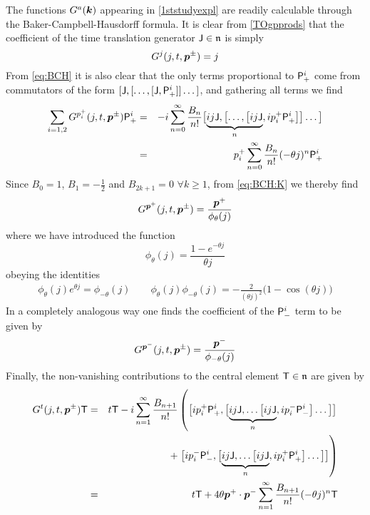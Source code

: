 The functions $G^a(\mk)$ appearing in \eqref{1ststudyexpl} are readily
calculable through the Baker-Campbell-Hausdorff formula. It is clear from
\eqref{TOgpprods} that the coefficient of the time translation generator
$\J\in\mfn$ is simply
\begin{equation}
  \label{Gj}
  G^j(j,t,\mbp^\pm)=j
\end{equation}
From \eqref{eq:BCH} it is also clear that the only terms proportional to
$\P^i_+$ come from commutators of the form $[\J,[\dots,[\J,\P^i_+] ]\dots]$, and
gathering all terms we find
\begin{eqnarray}
  \label{GomzBn}
  \sum\limits_{i=1,2}  
  G^{p_i^+}(j,t,\mbp^\pm) \P^i_+&=&- i\sum_{n=0}^\infty
  \frac{B_n}{n!} \bigl[ \underbrace{ i j \J , \bigl[\dots , 
    \bigl[ i j\J}_n ,  i p_i^+ \P^i_+ \bigr] \bigr]
  \dots\bigr]\\\nn &=&
  p_i^+ \sum_{n=0}^\infty\frac{B_n}{n!} 
  (-\theta j)^n \P^i_+
\end{eqnarray}
Since $B_0=1$, $B_1=-\frac12$ and $B_{2k+1}=0$ $\forall k\geq1$, from
\eqref{eq:BCH:K} we thereby find
\begin{equation}
  \label{Gomz}
  G^{\mbp^+}(j,t,\mbp^\pm)=\frac{\mbp^+}{\phi_\theta(j)}
\end{equation}
where we have introduced the function
\begin{equation}
  \label{phithetadef}
  \phi_\theta(j)=\frac{1- e^{-\theta j}}{\theta j}
\end{equation}
obeying the identities
\begin{eqnarray}
  \phi_\theta(j)e^{\theta j}=\phi_{-\theta}(j) \qquad
  \phi_\theta(j)\phi_{-\theta}(j)=-\frac2{(\theta j)^2}\bigl(1-\cos(\theta j)\bigr)
\label{phithetaids}
\end{eqnarray}
In a completely analogous way one finds the coefficient of the $\P^i_-$ term to
be given by
\begin{equation}
  \label{Gmz}
  G^{\mbp^-}(j,t,\mbp^\pm)=\frac{\mbp^-}{{\phi_{-\theta}(j)}}
\end{equation}
Finally, the non-vanishing contributions to the central
element $\T\in\mfn$ are given by
\begin{eqnarray}
  \nn
  G^t(j,t,\mbp^\pm) \T&=&
  t \T- i\sum_{n=1}^\infty\frac{B_{n+1}}{n!} 
  \left(\bigl[ i p_i^+ \P^i_+ , \bigl[ 
    \underbrace{ i j \J , \dots\bigl[ i j \J}_n ,  i p_i^- 
    \P^i_- \bigr]\dots\bigr] \bigr]\right.\\\nn &&\qquad\qquad\qquad
  +\left.\bigl[ i p_i^- \P^i_- , \bigl[ 
    \underbrace{ i j \J , \dots\bigl[ i j \J}_n , 
    i p_i^+ \P^i_+ \bigr]\dots\bigr] \bigr]\right)\\
  \label{GtBn}
  &=&t \T+4\theta \mbp^+\cdot\mbp^- \sum_{n=1}^\infty\frac{B_{n+1}}
  {n!} (-\theta j)^n \T
\end{eqnarray}
